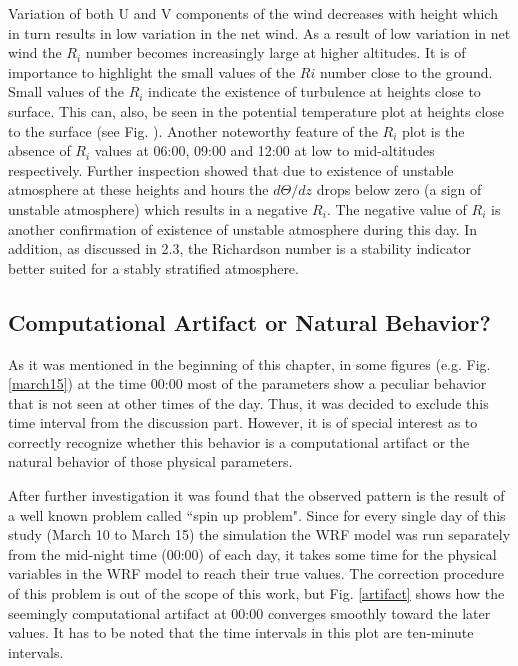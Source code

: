 \documentclass[a4paper,12pt]{article}
\numberwithin{equation}{section} %
\begin{document}
Variation of both U and V components of the wind decreases with height which in turn results in low variation in the net wind. As a result of low variation in net wind the $R_i$ number becomes increasingly large at higher altitudes. It is of importance to highlight the small values of the $Ri$ number close to the ground. Small values of the $R_i$ indicate the existence of turbulence at heights close to surface. This can, also, be seen in the potential temperature plot at heights close to the surface (see Fig. ). Another noteworthy feature of the $R_i$ plot is the absence of $R_i$ values at 06:00, 09:00 and 12:00 at low to mid-altitudes respectively. Further inspection showed that due to existence of unstable atmosphere at these heights and hours the $d\Theta/dz$ drops below zero (a sign of unstable atmosphere) which results in a negative $R_i$. The negative value of $R_i$ is another confirmation of existence of unstable atmosphere during this day. In addition, as discussed in 2.3, the Richardson number is a stability indicator better suited for a stably stratified atmosphere.

\subsection{Computational Artifact or Natural Behavior?}

As it was mentioned in the beginning of this chapter, in some figures (e.g. Fig. \ref{march15}) at the time 00:00 most of the parameters show a peculiar behavior that is not seen at other times of the day. Thus, it was decided to exclude this time interval from the discussion part. However, it is of special interest as to correctly recognize whether this behavior is a computational artifact or the natural behavior of those physical parameters. 

After further investigation it was found that the observed pattern is the result of a well known problem called ``spin up problem". Since for every single day of this study (March 10 to March 15) the simulation the WRF model was run separately from the mid-night time (00:00) of each day, it takes some time for the physical variables in the WRF model to reach their true values. The correction procedure of this problem is out of the scope of this work, but Fig. \ref{artifact} shows how the seemingly computational artifact at 00:00 converges smoothly toward the later values. It has to be noted that the time intervals in this plot are ten-minute intervals.
\end{document}
